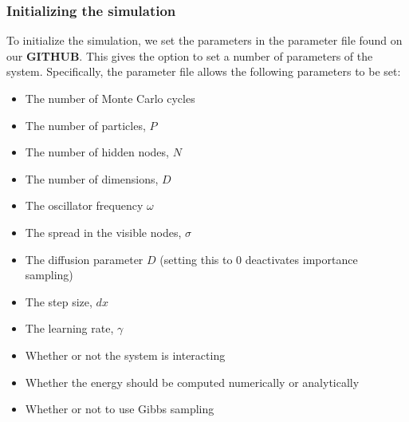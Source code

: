 \documentclass[a4paper, 10pt]{article}
\begin{document}
	\subsubsection{Initializing the simulation}
	To initialize the simulation, we set the parameters in the parameter file found on our \textbf{GITHUB}. This gives the option to set a number of parameters of the system. Specifically, the parameter file allows the following parameters to be set:
	\begin{itemize}
	\item The number of Monte Carlo cycles
	\item The number of particles, $P$
	\item The number of hidden nodes, $N$
	\item The number of dimensions, $D$
	\item The oscillator frequency $\omega$
	\item The spread in the visible nodes, $\sigma$
	\item The diffusion parameter $D$ (setting this to $0$ deactivates importance sampling)
	\item The step size, $dx$
	\item The learning rate, $\gamma$
	\item Whether or not the system is interacting
	\item Whether the energy should be computed numerically or analytically
	\item Whether or not to use Gibbs sampling
	\end{itemize}
\end{document}
